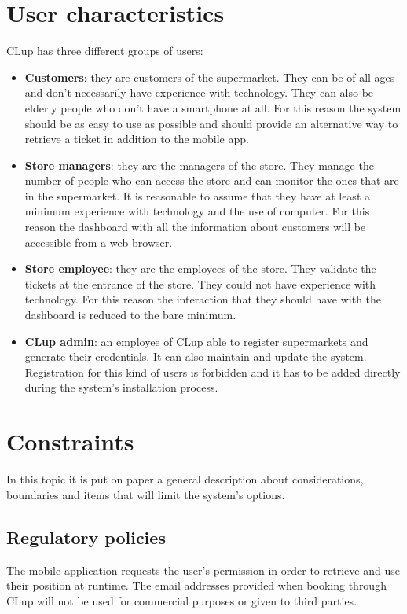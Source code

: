\section{User characteristics}
CLup has three different groups of users:
\begin{itemize}
	\item \textbf{Customers}: they are customers of the supermarket. They can be of all ages and don't necessarily have experience with technology. They can also be elderly
	people who don't have a smartphone at all. For this reason the system should be as easy to use as possible and should provide an alternative way to retrieve a ticket in
	addition to the mobile app.
	\item \textbf{Store managers}: they are the managers of the store. They manage the number of people who can access the store and can monitor the ones that
	are in the supermarket. It is reasonable to assume that they have at least a minimum experience with technology and the use of computer. For this reason the dashboard
	with all the information about customers will be accessible from a web browser.
	\item \textbf{Store employee}: they are the employees of the store. They validate the tickets at the entrance of the store. They could not have experience
	with technology. For this reason the interaction that they should have with the dashboard is reduced to the bare minimum.
    \item \textbf{CLup admin}: an employee of CLup able to register supermarkets and generate their credentials. It can also maintain and update the system. Registration for this kind of users is forbidden and it has to be added directly during the system's installation process.
\end{itemize}

\section{Constraints}
In this topic it is put on paper a general description about considerations, boundaries and items that will limit the system's options.

\subsection{Regulatory policies}
The mobile application requests the user's permission in order to retrieve and use their position at runtime. The email addresses provided when booking through CLup will not be used for commercial purposes or given to third parties.

